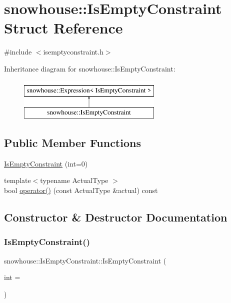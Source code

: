 \hypertarget{structsnowhouse_1_1IsEmptyConstraint}{}\section{snowhouse\+::Is\+Empty\+Constraint Struct Reference}
\label{structsnowhouse_1_1IsEmptyConstraint}


{\ttfamily \#include $<$isemptyconstraint.\+h$>$}

Inheritance diagram for snowhouse\+::Is\+Empty\+Constraint\+:\begin{figure}[H]
\begin{center}
\leavevmode
\includegraphics[height=2.000000cm]{structsnowhouse_1_1IsEmptyConstraint}
\end{center}
\end{figure}
\subsection*{Public Member Functions}
\begin{DoxyCompactItemize}
\item 
\mbox{\hyperlink{structsnowhouse_1_1IsEmptyConstraint_aba3bddd47d74a61b66bfda7b43d354d8}{Is\+Empty\+Constraint}} (int=0)
\item 
{\footnotesize template$<$typename Actual\+Type $>$ }\\bool \mbox{\hyperlink{structsnowhouse_1_1IsEmptyConstraint_aa36286df70833fb33af6247c62dba704}{operator()}} (const Actual\+Type \&actual) const
\end{DoxyCompactItemize}


\subsection{Constructor \& Destructor Documentation}
\mbox{\label{structsnowhouse_1_1IsEmptyConstraint_aba3bddd47d74a61b66bfda7b43d354d8}} 
\subsubsection{\texorpdfstring{IsEmptyConstraint()}{IsEmptyConstraint()}}
{\footnotesize\ttfamily snowhouse\+::\+Is\+Empty\+Constraint\+::\+Is\+Empty\+Constraint (\begin{DoxyParamCaption}\item[{int}]{ = {} }\end{DoxyParamCaption})\hspace{0.3cm}{\ttfamily [inline]}}



